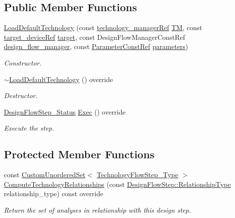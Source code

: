 \subsection*{Public Member Functions}
\begin{DoxyCompactItemize}
\item 
\hyperlink{classLoadDefaultTechnology_a0f81733b532c34d8df466741a3e8dd82}{Load\+Default\+Technology} (const \hyperlink{technology__manager_8hpp_a4b9ecd440c804109c962654f9227244e}{technology\+\_\+manager\+Ref} \hyperlink{classTechnologyFlowStep_a4aeea30129ed65348c3bad932b3a135b}{TM}, const \hyperlink{target__device_8hpp_acedb2b7a617e27e6354a8049fee44eda}{target\+\_\+device\+Ref} \hyperlink{classTechnologyFlowStep_a1a16880c55bddc3f9dbc495636d7a8cb}{target}, const Design\+Flow\+Manager\+Const\+Ref \hyperlink{classDesignFlowStep_ab770677ddf087613add30024e16a5554}{design\+\_\+flow\+\_\+manager}, const \hyperlink{Parameter_8hpp_a37841774a6fcb479b597fdf8955eb4ea}{Parameter\+Const\+Ref} \hyperlink{classDesignFlowStep_a802eaafe8013df706370679d1a436949}{parameters})
\begin{DoxyCompactList}\small\item\em Constructor. \end{DoxyCompactList}\item 
\hyperlink{classLoadDefaultTechnology_a214186318c11cfe41727e61323efc677}{$\sim$\+Load\+Default\+Technology} () override
\begin{DoxyCompactList}\small\item\em Destructor. \end{DoxyCompactList}\item 
\hyperlink{design__flow__step_8hpp_afb1f0d73069c26076b8d31dbc8ebecdf}{Design\+Flow\+Step\+\_\+\+Status} \hyperlink{classLoadDefaultTechnology_ad3943a87c0ecb17d3823a40c4e959df6}{Exec} () override
\begin{DoxyCompactList}\small\item\em Execute the step. \end{DoxyCompactList}\end{DoxyCompactItemize}
\subsection*{Protected Member Functions}
\begin{DoxyCompactItemize}
\item 
const \hyperlink{classCustomUnorderedSet}{Custom\+Unordered\+Set}$<$ \hyperlink{technology__flow__step_8hpp_a65208cfec963a7d7def292f9db428292}{Technology\+Flow\+Step\+\_\+\+Type} $>$ \hyperlink{classLoadDefaultTechnology_a7c86cdd7c8b95b248a7bca14cc1d81f3}{Compute\+Technology\+Relationships} (const \hyperlink{classDesignFlowStep_a723a3baf19ff2ceb77bc13e099d0b1b7}{Design\+Flow\+Step\+::\+Relationship\+Type} relationship\+\_\+type) const override
\begin{DoxyCompactList}\small\item\em Return the set of analyses in relationship with this design step. \end{DoxyCompactList}\end{DoxyCompactItemize}

